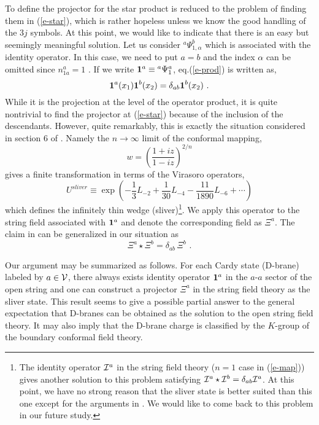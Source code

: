 \documentclass[a4paper,12pt]{article}
\begin{document}
To define the projector for the star product is reduced to
the problem of finding them in (\ref{e-star}),
which is rather hopeless unless we know the good handling
of the $3j$ symbols. At this point, we would like to indicate
that there is an easy but seemingly meaningful solution. 
Let us consider ${}^a\Psi^b_{1,\alpha}$ which is associated with 
the identity operator. In this case, we need to put
$a=b$ and the index $\alpha$ can be
omitted since $n_{1a}^a=1$ .  If we write ${\bf 1}^a\equiv {}^a\Psi^a_1$,
eq.(\ref{e-prod}) is written as,
\begin{equation}
 {\bf 1}^a(x_1){\bf 1}^b(x_2)= \delta_{ab}{\bf 1}^b(x_2)\,\,.
\end{equation}
While it is the projection at the level of the operator product,
it is quite nontrivial to find the projector at (\ref{e-star})
because of the inclusion of the descendants.
However, quite remarkably, this is exactly the situation considered
in section 6 of \cite{r-RZ}.  Namely the $n\rightarrow \infty$ limit
of the conformal mapping,
\begin{equation}\label{e-map}
 w=\left(\frac{1+iz}{1-iz}\right)^{2/n}
\end{equation}
gives a finite transformation in terms of the Virasoro operators,
\begin{equation}
U^{sliver}\equiv \exp\left(-\frac{1}{3}L_{-2}+\frac{1}{30}L_{-4}
-\frac{11}{1890}L_{-6}+\cdots\right)
\end{equation}
which defines the infinitely thin wedge (sliver)\footnote{
The identity operator ${\cal I}^a$ in the string field theory 
($n=1$ case in (\ref{e-map})) gives another solution to this problem
satisfying
${\cal I}^a\star {\cal I}^b=\delta_{ab}{\cal I}^a$.  At this point,
we have no strong reason that the sliver state is better suited
than  this one except for the arguments in \cite{r-RSZ1,r-RSZ2}. 
We would like to come back to this problem in our future study.}.
We apply this operator to the string field associated with 
${\bf 1}^a$ and denote the corresponding
field as $\Xi^a$.  The claim in \cite{r-RZ} can be generalized 
in our situation as
\begin{equation}\label{e-Xi}
 \Xi^a\star\Xi^b=\delta_{ab}\,\Xi^b\,\,.
\end{equation}

Our argument may be summarized as follows.  For each Cardy state
(D-brane) labeled by $a\in\cal V$,  there always exists identity
operator ${\bf 1}^a$ in the $a$-$a$ sector of the open string
and one can construct a projector $\Xi^a$ 
in the string field theory as the sliver state.
This result seems to give a possible partial 
answer to the general expectation that D-branes can be obtained as
the solution to the open string field theory.
It may also imply that the D-brane charge
is classified by the $K$-group
of the boundary conformal field theory.
\end{document}
